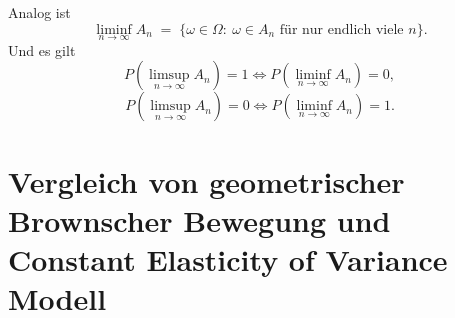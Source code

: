 \begin{bem}
Analog ist
$$
\liminf_{n\to\infty} A_n \;=\; \{\omega\in\Omega:\ \omega\in A_n\text{ für nur endlich viele }n\}.
$$
Und es gilt
$$P(\limsup_{n \to \infty} A_n) = 1 \iff P(\liminf_{n \to \infty} A_n) = 0,$$
$$P(\limsup_{n \to \infty} A_n) = 0 \iff P(\liminf_{n \to \infty} A_n) = 1.$$
\end{bem}

\newpage
\section{Vergleich von geometrischer Brownscher Bewegung und Constant Elasticity of Variance Modell}

\begin{center}
    \begin{sideways}
    \end{sideways}
    \label{fig:table_gbm_cev}
\end{center}
